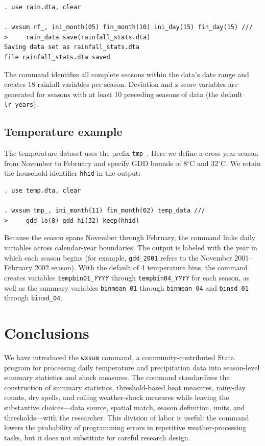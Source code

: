 \begin{stverbatim}
\begin{verbatim}
. use rain.dta, clear

. wxsum rf_, ini_month(05) fin_month(10) ini_day(15) fin_day(15) ///
>     rain_data save(rainfall_stats.dta)
Saving data set as rainfall_stats.dta
file rainfall_stats.dta saved
\end{verbatim}
\end{stverbatim}

\noindent The command identifies all complete seasons within the data's date range and creates 18 rainfall variables per season. Deviation and z-score variables are generated for seasons with at least 10 preceding seasons of data (the default \texttt{lr\_years}).

\subsection{Temperature example}

The temperature dataset uses the prefix \texttt{tmp\_}. Here we define a cross-year season from November to February and specify GDD bounds of 8$^{\circ}$C and 32$^{\circ}$C. We retain the household identifier \texttt{hhid} in the output:

\begin{stverbatim}
\begin{verbatim}
. use temp.dta, clear

. wxsum tmp_, ini_month(11) fin_month(02) temp_data ///
>     gdd_lo(8) gdd_hi(32) keep(hhid)
\end{verbatim}
\end{stverbatim}

\noindent Because the season spans November through February, the command links daily variables across calendar-year boundaries. The output is labeled with the year in which each season begins (for example, \texttt{gdd\_2001} refers to the November 2001--February 2002 season). With the default of 4 temperature bins, the command creates variables \texttt{tempbin01\_\textit{YYYY}} through \texttt{tempbin04\_\textit{YYYY}} for each season, as well as the summary variables \texttt{binmean\_01} through \texttt{binmean\_04} and \texttt{binsd\_01} through \texttt{binsd\_04}.

\section{Conclusions}

We have introduced the \texttt{wxsum} command, a community-contributed Stata program for processing daily temperature and precipitation data into season-level summary statistics and shock measures. The command standardizes the construction of summary statistics, threshold-based heat measures, rainy-day counts, dry spells, and rolling weather-shock measures while leaving the substantive choices---data source, spatial match, season definition, units, and thresholds---with the researcher. This division of labor is useful: the command lowers the probability of programming errors in repetitive weather-processing tasks, but it does not substitute for careful research design.

